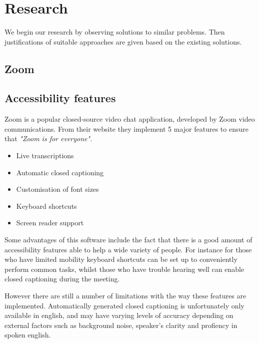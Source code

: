 \section{Research}
\label{sec:research}


We begin our research by observing solutions to similar 
problems. Then justifications of suitable approaches are given
based on the existing solutions.

\subsection{Zoom}

\subsection*{Accessibility features}

Zoom is a popular closed-source video chat application,
developed by Zoom video communications. From their website 
\cite{zoom} they implement 5 major features to ensure that 
\textit{"Zoom is for everyone"}. 

\begin{itemize}
  \item Live transcriptions
  \item Automatic closed captioning
  \item Customisation of font sizes
  \item Keyboard shortcuts
  \item Screen reader support
\end{itemize}

Some advantages of this software include the fact that there
is a good amount of accessibility features able to help a wide
variety of people. For instance for those who have limited 
mobility keyboard shortcuts can be set up to conveniently 
perform common tasks, whilst those who have trouble hearing
well can enable closed captioning during the meeting.

\vspace{0.2cm}

However there are still a number of limitations with the way 
these features are implemented. Automatically generated 
closed captioning is unfortunately only available in english,
and may have varying levels of accuracy depending on external
factors such as background noise, speaker's clarity and 
profiency in spoken english.

